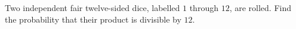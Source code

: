 Two independent fair twelve-sided dice, labelled $1$ through $12$, are rolled. Find the probability that their product is divisible by $12$.
